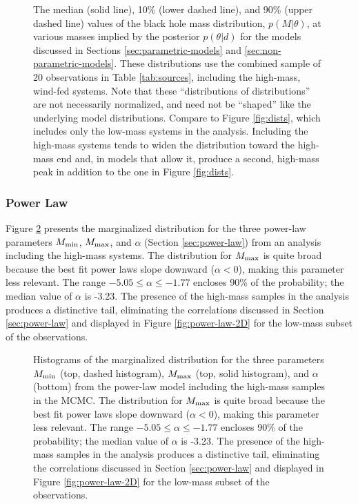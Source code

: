 \documentclass[preprint]{aastex}
\newcommand{\Mmin}{M_{\textnormal{min}}}
\newcommand{\Mmax}{M_{\textnormal{max}}}
\begin{document}
\begin{figure}
  \begin{center}
  \end{center}
  \caption{\label{fig:high-mass-dists} The median (solid line), 10\%
    (lower dashed line), and 90\% (upper dashed line) values of the
    black hole mass distribution, $p(M|\theta)$, at various masses
    implied by the posterior $p(\theta|d)$ for the models discussed in
    Sections \ref{sec:parametric-models} and
    \ref{sec:non-parametric-models}.  These distributions use the
    combined sample of 20 observations in Table \ref{tab:sources},
    including the high-mass, wind-fed systems.  Note that these
    ``distributions of distributions'' are not necessarily normalized,
    and need not be ``shaped'' like the underlying model
    distributions.  Compare to Figure \ref{fig:dists}, which includes
    only the low-mass systems in the analysis.  Including the
    high-mass systems tends to widen the distribution toward the
    high-mass end and, in models that allow it, produce a second,
    high-mass peak in addition to the one in Figure
    \ref{fig:dists}. }
\end{figure}

\subsubsection{Power Law}

Figure \ref{fig:power-law-high} presents the marginalized
distribution for the three power-law parameters $\Mmin$, $\Mmax$, and
$\alpha$ (Section \ref{sec:power-law}) from an analysis including the
high-mass systems.  The distribution for $\Mmax$ is quite broad
because the best fit power laws slope downward ($\alpha < 0$), making
this parameter less relevant.  The range $-5.05 \leq \alpha \leq
-1.77$ encloses 90\% of the probability; the median value of $\alpha$
is -3.23.  The presence of the high-mass samples in the analysis
produces a distinctive tail, eliminating the correlations discussed in
Section \ref{sec:power-law} and displayed in Figure
\ref{fig:power-law-2D} for the low-mass subset of the observations.

\begin{figure}
  \begin{center}
  \end{center}
  \caption{\label{fig:power-law-high} Histograms of the marginalized
    distribution for the three parameters $\Mmin$ (top, dashed
    histogram), $\Mmax$ (top, solid histogram), and $\alpha$ (bottom)
    from the power-law model including the high-mass samples in the
    MCMC.  The distribution for $\Mmax$ is quite broad because the
    best fit power laws slope downward ($\alpha < 0$), making this
    parameter less relevant.  The range $-5.05 \leq \alpha \leq -1.77$
    encloses 90\% of the probability; the median value of $\alpha$ is
    -3.23.  The presence of the high-mass samples in the analysis
    produces a distinctive tail, eliminating the correlations
    discussed in Section \ref{sec:power-law} and displayed in Figure
    \ref{fig:power-law-2D} for the low-mass subset of the
    observations. }
\end{figure}
\end{document}
